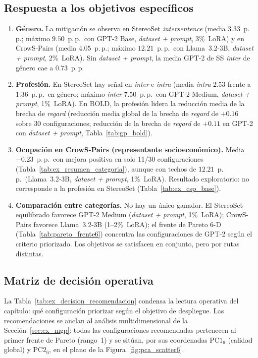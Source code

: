 \documentclass[12pt,a4paper]{report}
\newcommand{\PConeSix}{\ensuremath{\mathrm{PC1}_6}}
\newcommand{\PCtwoSix}{\ensuremath{\mathrm{PC2}_6}}
\begin{document}
\subsection{Respuesta a los objetivos específicos}
\label{subsec:ex_objetivos}

\begin{enumerate}[leftmargin=*]
  \item \textbf{Género.} La mitigación se observa en StereoSet \textit{intersentence} (media $3.33$~p.\,p.; máximo $9.50$~p.\,p.\ con GPT-2 Base, \textit{dataset + prompt}, 3\%~LoRA) y en CrowS-Pairs (media $4.05$~p.\,p.; máximo $12.21$~p.\,p.\ con Llama~3.2-3B, \textit{dataset + prompt}, 2\%~LoRA). Sin \textit{dataset + prompt}, la media GPT-2 de SS \textit{inter} de género cae a $0.73$~p.\,p.
  \item \textbf{Profesión.} En StereoSet hay señal en \textit{inter} e \textit{intra} (media \textit{intra} $2.53$ frente a $1.36$~p.\,p.\ en género; máximo \textit{inter} $7.50$~p.\,p.\ con GPT-2 Medium, \textit{dataset + prompt}, 1\%~LoRA). En BOLD, la profesión lidera la reducción media de la brecha de \textit{regard} (reducción media global de la brecha de \textit{regard} de $+0.16$ sobre 30 configuraciones; reducción de la brecha de \textit{regard} de $+0.11$ en GPT-2 con \textit{dataset + prompt}, Tabla~\ref{tab:gp_bold}).
  \item \textbf{Ocupación en CrowS-Pairs (representante socioeconómico).} Media $-0.23$~p.\,p.\ con mejora positiva en solo 11/30 configuraciones (Tabla~\ref{tab:ex_resumen_categoria}), aunque con techos de $12.21$~p.\,p.\ (Llama~3.2-3B, \textit{dataset + prompt}, 1\%~LoRA). Resultado exploratorio: no corresponde a la profesión en StereoSet (Tabla~\ref{tab:ex_csp_base}).
  \item \textbf{Comparación entre categorías.} No hay un único ganador. El StereoSet equilibrado favorece GPT-2 Medium (\textit{dataset + prompt}, 1\%~LoRA); CrowS-Pairs favorece Llama~3.2-3B (1--2\%~LoRA); el frente de Pareto 6-D (Tabla~\ref{tab:pareto_frente6}) concentra las configuraciones de GPT-2 según el criterio priorizado. Los objetivos se satisfacen en conjunto, pero por rutas distintas.
\end{enumerate}


\subsection{Matriz de decisión operativa}
\label{subsec:ex_matriz_decision}

La Tabla~\ref{tab:ex_decision_recomendacion} condensa la lectura operativa del capítulo: qué configuración priorizar según el objetivo de despliegue. Las recomendaciones se anclan al análisis multidimensional de la Sección~\ref{sec:ex_mgp}: todas las configuraciones recomendadas pertenecen al primer frente de Pareto (rango~1) y se sitúan, por sus coordenadas \PConeSix{} (calidad global) y \PCtwoSix{}, en el plano de la Figura~\ref{fig:pca_scatter6}.
\end{document}
